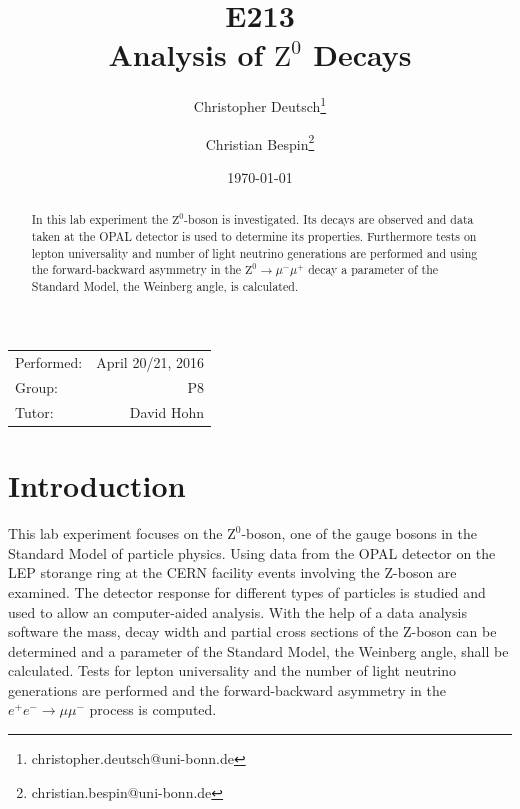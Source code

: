 \documentclass[11pt, a4paper]{article}
\title{E213 \\ Analysis of $\mathrm{Z}^0$ Decays}
\author{Christopher Deutsch\footnote{christopher.deutsch@uni-bonn.de} \and Christian Bespin\footnote{christian.bespin@uni-bonn.de}}
\date{\today}
\numberwithin{equation}{section}
\begin{document}
\begin{titlepage}

\maketitle

\begin{center}
\begin{tabular}{l r}
Performed: & April 20/21, 2016 \\
Group: & P8 \\
Tutor: & David Hohn
\end{tabular}
\end{center}

\begin{abstract}
	\noindent In this lab experiment the $\mathrm{Z^0}$-boson is investigated.
	Its decays are observed and data taken at the OPAL detector is used to determine its properties.
	Furthermore tests on lepton universality and number of light neutrino generations are performed and using the forward-backward asymmetry in the $\mathrm{Z}^0 \rightarrow \mu^- \mu^+$ decay a parameter of the Standard Model, the Weinberg angle, is calculated.
\end{abstract}

\end{titlepage}

\tableofcontents
\newpage

\section{Introduction}

This lab experiment focuses on the $\mathrm{Z}^0$-boson, one of the gauge bosons in the Standard Model of particle physics.
Using data from the OPAL detector on the LEP storange ring at the CERN facility events involving the $\mathrm{Z}$-boson are examined.
The detector response for different types of particles is studied and used to allow an computer-aided analysis.
With the help of a data analysis software the mass, decay width and partial cross sections of the $\mathrm{Z}$-boson can be determined and a parameter of the Standard Model, the Weinberg angle, shall be calculated.
Tests for lepton universality and the number of light neutrino generations are performed and the forward-backward asymmetry in the $e^+e^-\rightarrow\mu\mu^-$ process is computed.
\end{document}
